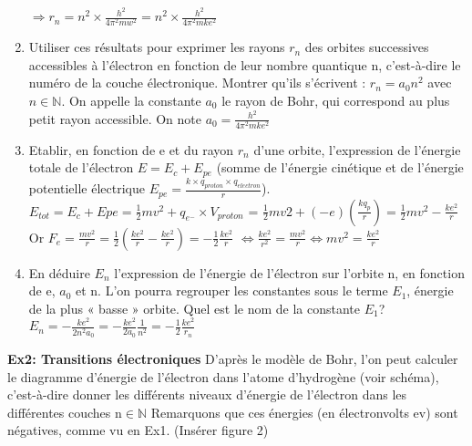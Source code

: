 \documentclass{article}
\begin{document}
\begin{enumerate}
    $\Longrightarrow r_{n} = n^{2}\times\frac{h^{2}}{4\pi^{2}mw^{2}} = n^{2}\times\frac{h^{2}}{4\pi^{2}mke^{2}}$
    \item Utiliser ces résultats pour exprimer les rayons $r_{n}$ des orbites successives accessibles à l’électron en fonction de leur nombre quantique n, c’est-à-dire le numéro de la couche électronique. Montrer qu’ils s’écrivent : $r_{n} = a_{0}n^{2}$ avec $n\in\mathbb{N}$. On appelle la constante $a_{0}$ le rayon de Bohr, qui correspond au plus petit rayon accessible.\newline
    On note $a_{0} = \frac{h^{2}}{4\pi^{2}mke^{2}}$
    \item Etablir, en fonction de e et du rayon $r_{n}$ d’une orbite, l’expression de l’énergie totale de l’électron $E = E_{c} + E_{pe}$ (somme de l’énergie cinétique et de l’énergie potentielle électrique $E_{pe} = \frac{k\times q_{proton}\times q_{electron}}{r}$).\newline
    $E_{tot} = E_{c}+E{pe} = \frac{1}{2}mv^{2} + q_{e^{-}}\times V_{proton}$\newline
    = $\frac{1}{2}mv{2} + (-e)(\frac{kq_{p}}{r}) = \frac{1}{2}mv^{2} - \frac{ke^{2}}{r}$\newline\newline
    Or $F_{e} = \frac{mv^{2}}{r} = \frac{1}{2}(\frac{ke^{2}}{r} - \frac{ke^{2}}{r}) = -\frac{1}{2}\frac{ke^{2}}{r}$\newline
    $\Longleftrightarrow \frac{ke^{2}}{r^{2}} = \frac{mv^{2}}{r} \Longleftrightarrow mv^{2} = \frac{ke^{2}}{r}$
    \item En déduire $E_{n}$ l’expression de l’énergie de l’électron sur l’orbite n, en fonction de e, $a_{0}$ et n. L’on pourra regrouper les constantes sous le terme $E_{1}$, énergie de la plus « basse » orbite. Quel est le nom de la constante $E_{1}$?\newline
    $E_{n} = -\frac{ke^{2}}{2n^{2}a_{0}} = -\frac{ke^{2}}{2a_{0}}\frac{1}{n^{2}} = -\frac{1}{2}\frac{ke^{2}}{r_{n}}$
\end{enumerate}

\textbf{Ex2: Transitions électroniques}\newline
\indent D’après le modèle de Bohr, l’on peut calculer le diagramme d’énergie de l’électron dans l’atome d’hydrogène (voir schéma), c’est-à-dire donner les différents niveaux d’énergie de l’électron dans les différentes couches n$\in\mathbb{N}$ Remarquons que ces énergies (en électronvolts ev) sont négatives, comme vu en Ex1.\newline
(Insérer figure 2)
\end{document}
